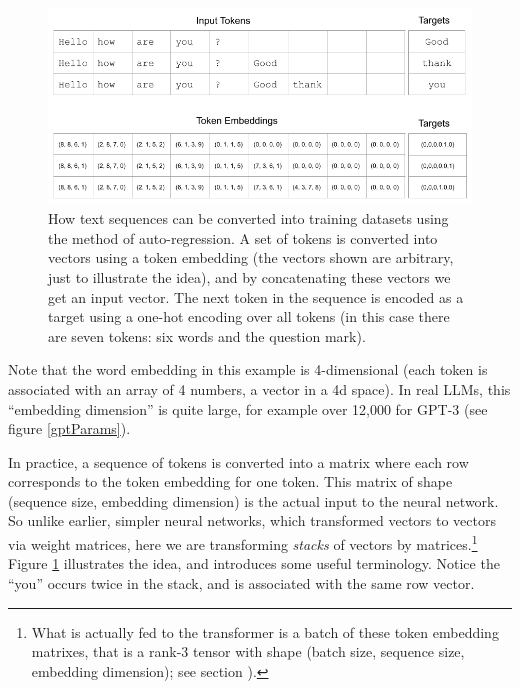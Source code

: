 \begin{figure}[ht]
\centering
\includegraphics[scale=.45]{./images/contextWindow.png}
\caption[Jeff Yoshimi]{How text sequences can be converted into training
datasets using the method of auto-regression. A set of tokens is converted into
vectors using a token embedding (the vectors shown are arbitrary, just to
illustrate the idea), and by concatenating these vectors we get an input
vector. The next token in the sequence is encoded as a target using a one-hot
encoding over all tokens (in this case there are seven tokens: six words and
the question mark).
}
\label{nextWordPrediction}
\end{figure}

Note that the word embedding in this example is 4-dimensional (each token is
associated with an array of 4 numbers, a vector in a 4d space). In real LLMs,
this ``embedding dimension'' is quite large, for example over 12,000 for GPT-3
(see figure \ref{gptParams}). 

In practice, a sequence of tokens is converted into a matrix where each row
corresponds to the token embedding for one token. This matrix of shape
(sequence size, embedding dimension) is the actual input to the neural network.
So unlike earlier, simpler neural networks, which transformed vectors to
vectors via weight matrices, here we are transforming \emph{stacks} of vectors
by matrices.\footnote{What is actually fed to the transformer is a batch of
these token embedding matrixes, that is a rank-3 tensor with shape (batch size,
sequence size, embedding dimension); see section ).}
Figure \ref{nextWordPrediction} illustrates the idea, and introduces some
useful terminology. Notice the ``you'' occurs twice in the stack, and is
associated with the same row vector.

